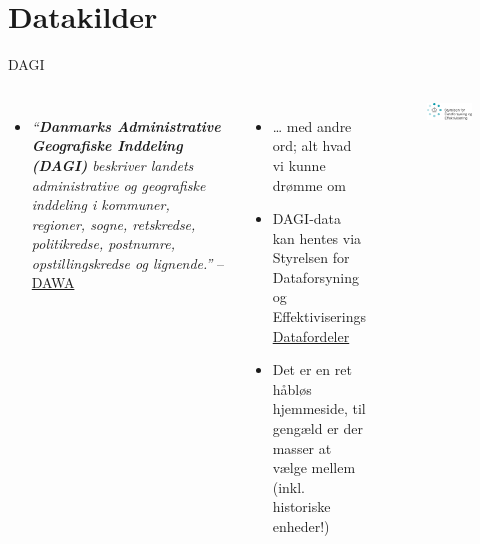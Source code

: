 \documentclass[
  8pt,
  ignorenonframetext,
  aspectratio=169]{beamer}
\providecommand{\tightlist}{%
  \setlength{\itemsep}{0pt}\setlength{\parskip}{0pt}}
\newcommand{\columnsbegin}{\begin{columns}}
\newcommand{\columnsend}{\end{columns}}
\begin{document}
\hypertarget{datakilder}{%
\section{Datakilder}\label{datakilder}}

\begin{frame}{DAGI}
\protect\hypertarget{dagi}{}
\columnsbegin


\begin{itemize}
\tightlist
\item
  \emph{``\textbf{Danmarks Administrative Geografiske Inddeling (DAGI)}
  beskriver landets administrative og geografiske inddeling i kommuner,
  regioner, sogne, retskredse, politikredse, postnumre,
  opstillingskredse og lignende.''} --
  \href{https://dawadocs.dataforsyningen.dk/dok/dagi}{DAWA}
\end{itemize}

\medskip

\begin{itemize}
\item
  \ldots{} med andre ord; alt hvad vi kunne drømme om
\item
  DAGI-data kan hentes via Styrelsen for Dataforsyning og
  Effektiviserings
  \href{https://datafordeler.dk/dataoversigt/}{Datafordeler}
\item
  Det er en ret håbløs hjemmeside, til gengæld er der masser at vælge
  mellem (inkl. historiske enheder!)
\end{itemize}


\begin{figure}[H]
    \centering
    \includegraphics[width=.90\textwidth]{pictures/logo_sdfe.png}
\end{figure}

\columnsend
\end{frame}
\end{document}
